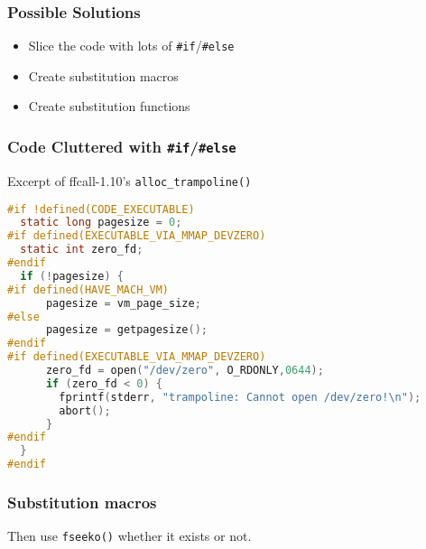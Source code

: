 \documentclass{beamer}
\newcommand{\filenamew}[1]{{{\textit{\begingroup \urlstyle{sf}\Url{#1}}}}}
\begin{document}
\begin{frame}
\frametitle{Possible Solutions}
\begin{itemize}
\item Slice the code with lots of \texttt{\#if}/\texttt{\#else}
\item Create substitution macros
\item Create substitution functions
\end{itemize}


\end{frame}

\begin{frame}[fragile]
\frametitle{Code Cluttered with \texttt{\#if}/\texttt{\#else}}

\begin{block}{Excerpt of ffcall-1.10's \texttt{alloc\_trampoline()}}
\scriptsize
\begin{lstlisting}[language=C]
#if !defined(CODE_EXECUTABLE)
  static long pagesize = 0;
#if defined(EXECUTABLE_VIA_MMAP_DEVZERO)
  static int zero_fd;
#endif
  if (!pagesize) {
#if defined(HAVE_MACH_VM)
      pagesize = vm_page_size;
#else
      pagesize = getpagesize();
#endif
#if defined(EXECUTABLE_VIA_MMAP_DEVZERO)
      zero_fd = open("/dev/zero", O_RDONLY,0644);
      if (zero_fd < 0) {
        fprintf(stderr, "trampoline: Cannot open /dev/zero!\n");
        abort();
      }
#endif
  }
#endif
\end{lstlisting}
\end{block}

\end{frame}

\begin{frame}[fragile]
\frametitle{Substitution macros}


Then use \texttt{fseeko()} whether it exists or not.
\end{frame}
\end{document}
